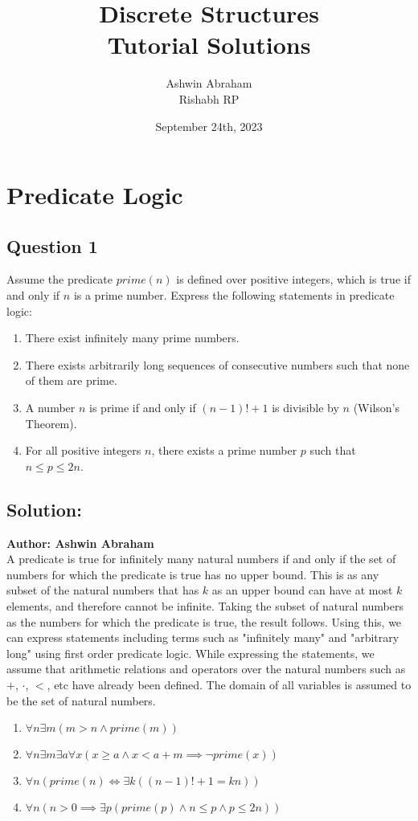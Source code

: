 \documentclass[12pt]{report}
\title{\Huge \textbf{Discrete Structures}\\\Large \textbf{Tutorial Solutions}}
\author{\Large Ashwin Abraham\\\Large Rishabh RP}
\date{\Large September 24th, 2023}
\begin{document}
\begin{titlepage}
    \maketitle
\end{titlepage}

\tableofcontents
\newpage

\chapter{Predicate Logic}
\section*{Question 1}
Assume the predicate $prime(n)$ is defined over positive integers, which is true if and only if $n$ is a prime number. Express the following statements in predicate logic:
\begin{enumerate}
  \item There exist infinitely many prime numbers.
  \item There exists arbitrarily long sequences of consecutive numbers such that none of them are prime.
  \item A number $n$ is prime if and only if $(n - 1)! + 1$ is divisible by $n$ (Wilson's Theorem).
  \item For all positive integers $n$, there exists a prime number $p$ such that $n \leq p \leq 2n$.
\end{enumerate}

\section*{Solution:}
\textbf{Author: Ashwin Abraham}\\
A predicate is true for infinitely many natural numbers if and only if the set of numbers for which the predicate is true has no upper bound. This is as any subset of the natural numbers that has $k$ as an upper bound can have at most $k$ elements, and therefore cannot be infinite. Taking the subset of natural numbers as the numbers for which the predicate is true, the result follows. Using this, we can express statements including terms such as "infinitely many" and "arbitrary long" using first order predicate logic. While expressing the statements, we assume that arithmetic relations and operators over the natural numbers such as $+$, $\cdot$, $<$, etc have already been defined. The domain of all variables is assumed to be the set of natural numbers. 
\begin{enumerate}
  \item $\forall n \exists m (m > n \land prime(m))$
  \item $\forall n \exists m \exists a \forall x (x \geq a \land x < a + m \implies \neg prime(x))$
  \item $\forall n (prime(n) \iff \exists k ((n - 1)! + 1 = kn))$
  \item $\forall n (n > 0 \implies \exists p (prime(p) \land n \leq p \land p \leq 2n))$
\end{enumerate}
\end{document}
